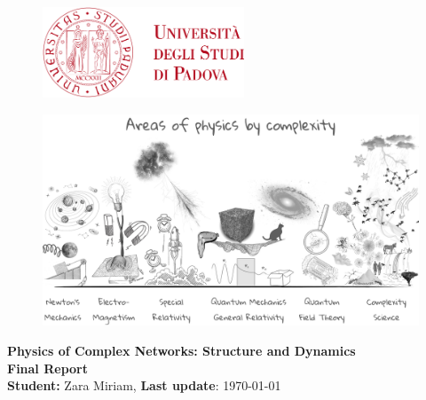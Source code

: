\begin{center}

\vspace*{1cm}

\begin{figure}
  \raggedleft
  \begin{minipage}{4cm}
  \includegraphics[width=6cm]{images/logo.png}
  \end{minipage}
\end{figure}

\begin{figure}[H]
    \centering
    \includegraphics[width=\textwidth]{images/areas_of_physics.png} 
\end{figure}
\vspace*{1cm}
\textcolor{unipd}{\textbf{\large Physics of Complex Networks: Structure and Dynamics}} \\
\vspace*{1cm}
\textcolor{unipd}{\textbf{\huge Final Report}} \\
\vspace*{2cm}
\textbf{Student:} Zara Miriam, \hfill \textbf{Last update}: \today\\\\
\end{center}



\thispagestyle{empty} %
\clearpage\setcounter{page}{1} %
